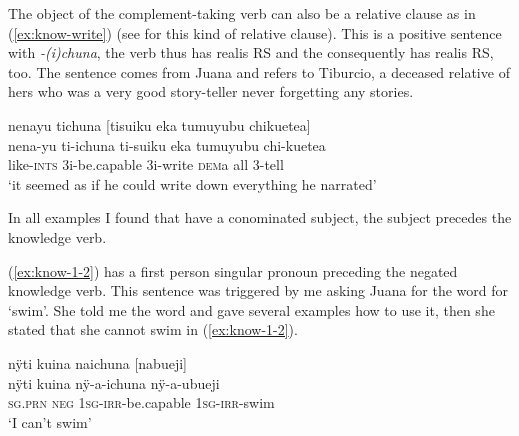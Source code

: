 The object of the complement-taking verb can also be a relative clause as in (\ref{ex:know-write}) (see  for this kind of relative clause). This is a positive sentence with \textit{-(i)chuna}, the verb thus has realis RS and the  consequently has realis RS, too. The sentence comes from Juana and refers to Tiburcio, a deceased relative of hers who was a very good story-teller never forgetting any stories.

\ea\label{ex:know-write}
\begingl
\glpreamble nenayu tichuna \textup{[}tisuiku eka tumuyubu chikuetea\textup{]}\\
\gla nena-yu ti-ichuna ti-suiku eka tumuyubu chi-kuetea\\
\glb like-\textsc{ints} 3i-be.capable 3i-write \textsc{dem}a all 3-tell\\
\glft ‘it seemed as if he could write down everything he narrated’
\endgl
\trailingcitation{[jmx-n120429ls-x5.042]}
\xe


In all examples I found that have a conominated subject, the subject precedes the knowledge verb.

%

(\ref{ex:know-1-2}) has a first person singular pronoun preceding the negated knowledge verb. This sentence was triggered by me asking Juana for the word for ‘swim’. She told me the word and gave several examples how to use it, then she stated that she cannot swim in (\ref{ex:know-1-2}).

\ea\label{ex:know-1-2}
\begingl
\glpreamble nÿti kuina naichuna \textup{[}nabueji\textup{]}\\
\gla nÿti kuina nÿ-a-ichuna nÿ-a-ubueji\\
\textsc{sg.prn} \textsc{neg} 1\textsc{sg}-\textsc{irr}-be.capable 1\textsc{sg}-\textsc{irr}-swim \\
\glft ‘I can’t swim’
\endgl
\trailingcitation{[jxx-a120516l-a.561]}
\xe

